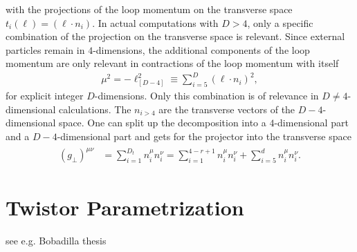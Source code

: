 with the projections of the loop momentum on the transverse space
$t_i(\ell) = (\ell \cdot n_i)$.  In actual computations with $D>4$, only a specific combination of the
projection on the transverse space is relevant. Since external
particles remain in $4$-dimensions, the additional components of the
loop momentum are only relevant in contractions of the loop momentum
with itself
\begin{align}
  \mu^2 = -\ell_{[D-4]}^2 \equiv \sum_{i=5}^D(\ell \cdot n_i)^2,
\end{align}
for explicit integer $D$-dimensions. Only this combination is of
relevance in $D\neq 4$-dimensional calculations. The $n_{i>4}$ are the transverse
vectors of the $D-4$-dimensional space. One can split up the
decomposition into a $4$-dimensional part and a $D-4$-dimensional part
and gets for the projector into the transverse space
\begin{align}\label{eq:metricprond}
\begin{split}
  (g_\perp)^{\mu\nu} &=  \sum_{i=1}^{D_t}n_i^\mu n_i^\nu=\sum_{i=1}^{4-r+1}n_i^\mu n_i^\nu +  \sum_{i=5}^{d}n_i^\mu n_i^\nu.
\end{split}
\end{align}



\chapter{Twistor Parametrization}
see e.g. Bobadilla thesis
